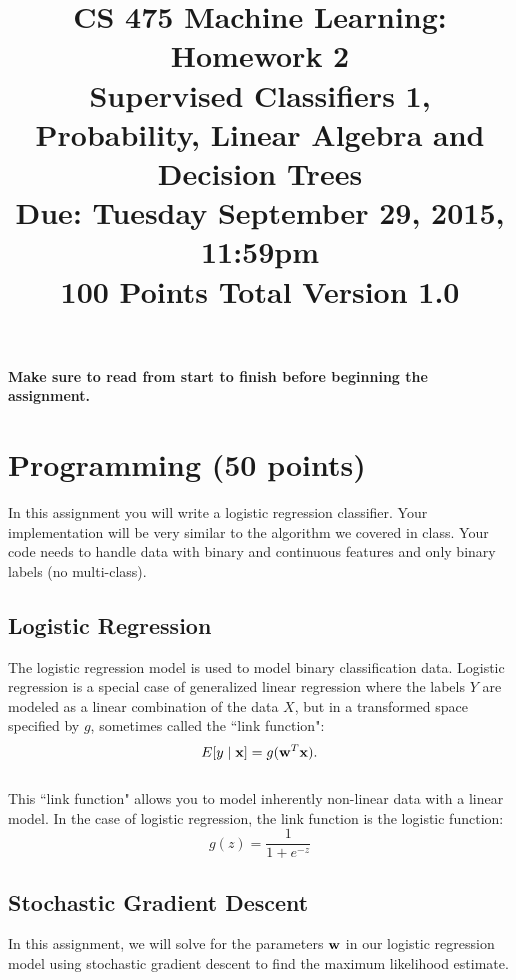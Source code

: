 \documentclass[11pt]{article}
\title{CS 475 Machine Learning: Homework 2\\Supervised Classifiers 1,\\
Probability, Linear Algebra and Decision Trees\\
\Large{Due: Tuesday September 29, 2015, 11:59pm}\\
100 Points Total \hspace{1cm} Version 1.0}
\author{}
\date{}
\newcommand{\vw}{{\bf w}}
\newcommand{\vx}{{\bf x}}
\begin{document}
\large
\maketitle
\thispagestyle{headings}

\vspace{-.5in}

{\bf Make sure to read from start to finish before beginning the assignment.}
\section{Programming (50 points)}
In this assignment you will write a logistic regression classifier. Your implementation will be very similar to
the algorithm we covered in class. Your code needs to handle data with binary and continuous features and only binary labels (no multi-class).

\subsection{Logistic Regression}
The logistic regression model is used to model binary classification data. Logistic regression is a special case of generalized linear regression where the labels $Y$ are modeled as a linear combination of the data $X$, but in a transformed space specified by $g$, sometimes called the ``link function":
\begin{equation}
E[y \mid \vx] = g(\vw^T\vx).
\end{equation}
\\
This ``link function" allows you to model inherently non-linear data with a linear model. In the case of logistic regression, the link function is the logistic function:
\begin{equation}
g(z) = \frac{1}{1 + e^{-z}}
\end{equation}

\subsection{Stochastic Gradient Descent}
In this assignment, we will solve for the parameters $\vw$ in our logistic regression model using stochastic gradient descent to find the maximum likelihood estimate.
\end{document}
